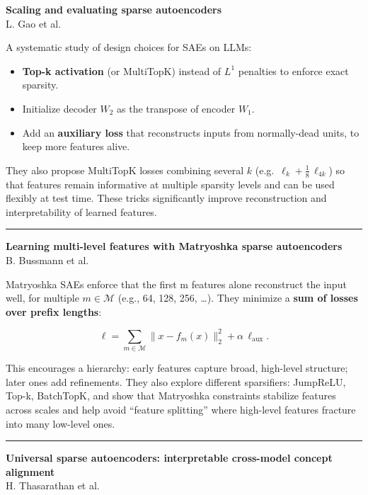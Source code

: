 \documentclass[a5paper]{article}
\providecommand{\tightlist}{%
  \setlength{\itemsep}{0pt}\setlength{\parskip}{0pt}}
\begin{document}
\textbf{Scaling and evaluating sparse autoencoders}\\
L. Gao et al.

A systematic study of design choices for SAEs on LLMs:

\begin{itemize}
\tightlist
\item
  \textbf{Top-k activation} (or MultiTopK) instead of $L^1$ penalties to
  enforce exact sparsity.
\item
  Initialize decoder $W_2$ as the transpose of encoder $W_1$.
\item
  Add an \textbf{auxiliary loss} that reconstructs inputs from
  normally-dead units, to keep more features alive.
\end{itemize}

They also propose MultiTopK losses combining several $k$ (e.g.~$\ell_k + \tfrac{1}{8}\,\ell_{4k}$)
so that features remain informative at multiple sparsity levels and can
be used flexibly at test time. These tricks significantly improve
reconstruction and interpretability of learned features.

\begin{center}\rule{0.5\linewidth}{0.5pt}\end{center}

\textbf{Learning multi-level features with Matryoshka sparse
autoencoders}\\
B. Bussmann et al.

Matryoshka SAEs enforce that the first m features alone reconstruct the
input well, for multiple $m\in\mathcal{M}$ (e.g., 64, 128, 256, \ldots). They minimize
a \textbf{sum of losses over prefix lengths}:

\[ \ell = \sum_{m\in\mathcal{M}} \| x - f_m(x) \|_2^2 + \alpha\,\ell_{\text{aux}}. \]

This encourages a hierarchy: early features capture broad, high-level
structure; later ones add refinements. They also explore different
sparsifiers: JumpReLU, Top-k, BatchTopK, and show that Matryoshka
constraints stabilize features across scales and help avoid ``feature
splitting'' where high-level features fracture into many low-level ones.

\begin{center}\rule{0.5\linewidth}{0.5pt}\end{center}

\textbf{Universal sparse autoencoders: interpretable cross-model concept
alignment}\\
H. Thasarathan et al.
\end{document}
